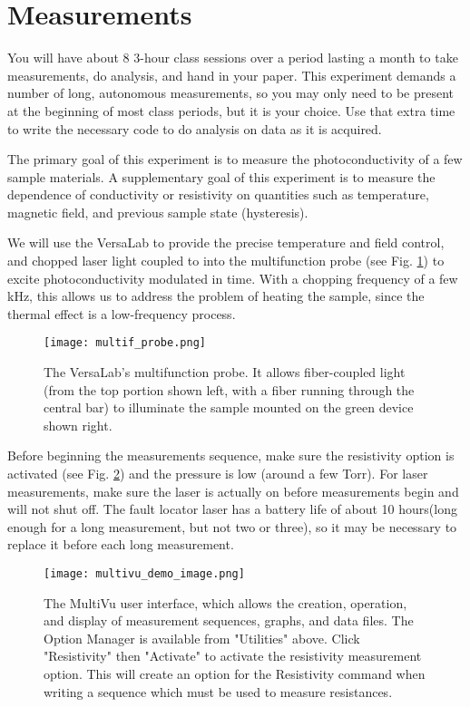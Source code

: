 \documentclass{article}
\begin{document}

\section*{Measurements}

You will have about 8 3-hour class sessions over a period lasting a month to take measurements, do analysis, and hand in your paper. This experiment demands a number of long, autonomous measurements, so you may only need to be present at the beginning of most class periods, but it is your choice. Use that extra time to write the necessary code to do analysis on data as it is acquired.

The primary goal of this experiment is to measure the photoconductivity of a few sample materials. A supplementary goal of this experiment is to measure the dependence of conductivity or resistivity on quantities such as temperature, magnetic field, and previous sample state (hysteresis).

We will use the VersaLab to provide the precise temperature and field control, and chopped laser light coupled to into the multifunction probe (see Fig. \ref{fig:multifunction_probe}) to excite photoconductivity modulated in time. With a chopping frequency of a few kHz, this allows us to address the problem of heating the sample, since the thermal effect is a low-frequency process.

\begin{figure}
    \centering
    \texttt{[image: multif\_probe.png]}
    \caption{The VersaLab's multifunction probe. It allows fiber-coupled light (from the top portion shown left, with a fiber running through the central bar) to illuminate the sample mounted on the green device shown right.}
    \label{fig:multifunction_probe}
\end{figure}


Before beginning the measurements sequence, make sure the resistivity option is activated (see Fig. \ref{fig:resistivity_option_multivu}) and the pressure is low (around a few Torr). For laser measurements, make sure the laser is actually on before measurements begin and will not shut off. The fault locator laser has a battery life of about 10 hours(long enough for a long measurement, but not two or three), so it may be necessary to replace it before each long measurement. 

\begin{figure}
    \centering
    \texttt{[image: multivu\_demo\_image.png]}
    \caption{The MultiVu user interface, which allows the creation, operation, and display of measurement sequences, graphs, and data files. The Option Manager is available from "Utilities" above. Click "Resistivity" then "Activate" to activate the resistivity measurement option. This will create an option for the Resistivity command when writing a sequence which must be used to measure resistances.}
    \label{fig:resistivity_option_multivu}
\end{figure}
\end{document}

